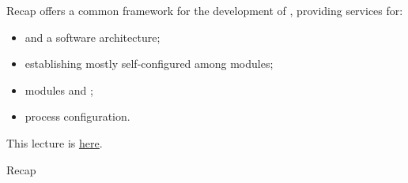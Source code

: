 
\begin{frame}{Recap}
	 offers a common framework for the development of , providing services for:
	\begin{itemize}
		\item {} and  a  software architecture;
		\item establishing mostly self-configured  among modules;
		\item modules  and ;
		\item process  configuration.
	\end{itemize}
	\bigskip
	This lecture is \href{https://github.com/robmasocco/DAFN24_Robotics_6}{\color{blue}\underline{here}}.
\end{frame}
\begin{frame}{Recap}
	\begin{alertblock}{}
		\centering
	\end{alertblock}
\end{frame}
